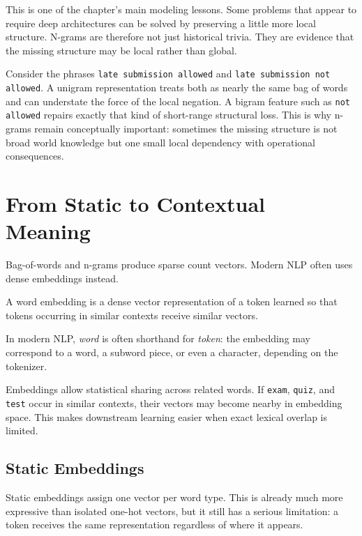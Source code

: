 This is one of the chapter's main modeling lessons. Some problems that appear to require deep architectures can be solved by preserving a little more local structure. N-grams are therefore not just historical trivia. They are evidence that the missing structure may be local rather than global.

\begin{example}
Consider the phrases \texttt{late submission allowed} and \texttt{late submission not allowed}. A unigram representation treats both as nearly the same bag of words and can understate the force of the local negation. A bigram feature such as \texttt{not allowed} repairs exactly that kind of short-range structural loss. This is why n-grams remain conceptually important: sometimes the missing structure is not broad world knowledge but one small local dependency with operational consequences.
\end{example}

\section{From Static to Contextual Meaning}

Bag-of-words and n-grams produce sparse count vectors. Modern NLP often uses dense embeddings instead.

\begin{definition}
A word embedding is a dense vector representation of a token learned so that tokens occurring in similar contexts receive similar vectors.
\end{definition}

In modern NLP, \emph{word} is often shorthand for \emph{token}: the embedding may correspond to a word, a subword piece, or even a character, depending on the tokenizer.

Embeddings allow statistical sharing across related words. If \texttt{exam}, \texttt{quiz}, and \texttt{test} occur in similar contexts, their vectors may become nearby in embedding space. This makes downstream learning easier when exact lexical overlap is limited.

\subsection{Static Embeddings}

Static embeddings assign one vector per word type. This is already much more expressive than isolated one-hot vectors, but it still has a serious limitation: a token receives the same representation regardless of where it appears.

